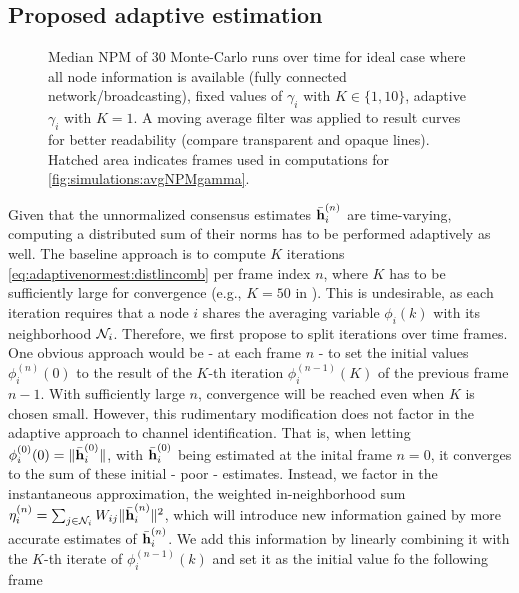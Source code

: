 \documentclass{article}
\begin{document}
\subsection[]{Proposed adaptive estimation}
\begin{figure}[t]
    \centering
    
    \vspace*{-0.6cm}
    \caption[]{Median NPM of 30 Monte-Carlo runs over time for ideal case where all node information is available (fully connected network/broadcasting), fixed values of \(\gamma_i\) with \(K \in \{1,10\}\), adaptive \(\gamma_i\) with \(K=1\). A moving average filter was applied to result curves for better readability (compare transparent and opaque lines). Hatched area indicates frames used in computations for \autoref{fig:simulations:avgNPMgamma}.}
    \label{fig:simulations:NPMtime}
\end{figure}
Given that the unnormalized consensus estimates \(\bar{\bm{\mathrm{h}}}_i^{(n)}\) \cite{blochbergerDBSI} are time-varying, computing a distributed sum of their norms has to be performed adaptively as well.
The baseline approach is to compute \(K\) iterations \eqref{eq:adaptivenormest:distlincomb} per frame index \(n\), where \(K\) has to be sufficiently large for convergence (e.g., \(K=50\) in \cite{yuDistributedBlindSystem2014,liuDistributedBlindIdentification2016}).
This is undesirable, as each iteration requires that a node \(i\) shares the averaging variable \(\phi_i(k)\) with its neighborhood \(\mathcal{N}_i\).
Therefore, we first propose to split iterations over time frames.
One obvious approach would be - at each frame \(n\) - to set the initial values \(\phi_i^{(n)}(0)\) to the result of the \(K\)-th iteration \(\phi_i^{(n-1)}(K)\) of the previous frame \(n-1\).
With sufficiently large \(n\), convergence will be reached even when \(K\) is chosen small.
However, this rudimentary modification does not factor in the adaptive approach to channel identification.
That is, when letting \(\phi_i^{(0)}(0) = \|\bar{\bm{\mathrm{h}}}_i^{(0)}\|\), with \(\bar{\bm{\mathrm{h}}}_i^{(0)}\) being estimated at the inital frame \(n=0\), it converges to the sum of these initial - poor - estimates.
Instead, we factor in the instantaneous approximation, the weighted in-neighborhood sum \(\eta_i^{(n)} = \sum_{j \in \mathcal{N}_i} W_{ij} \|\bar{\bm{\mathrm{h}}}_i^{(n)}\|^2\), which will introduce new information gained by more accurate estimates of \(\bar{\bm{\mathrm{h}}}_i^{(n)}\).
We add this information by linearly combining it with the \(K\)-th iterate of \(\phi_i^{(n-1)}(k)\) and set it as the initial value fo the following frame
\end{document}
